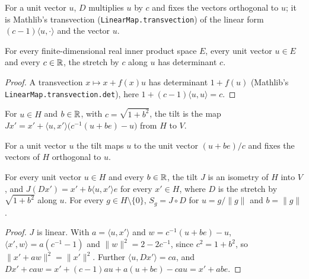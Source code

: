 For a unit vector $u$, $D$ multiplies $u$ by $c$ and fixes the vectors orthogonal to $u$; it is
Mathlib's transvection (\texttt{LinearMap.\allowbreak transvection}) of the linear form
$(c - 1)\langle u, \cdot \rangle$ and the vector $u$.

\begin{lemma}
\label{lem:det-stretch}
\leanok
{}
For every finite-dimensional real inner product space $E$, every unit vector $u \in E$ and every
$c \in \mathbb{R}$, the stretch by $c$ along $u$ has determinant $c$.
\end{lemma}

\begin{proof}
\leanok
A transvection $x \mapsto x + f(x) u$ has determinant $1 + f(u)$ (Mathlib's
\texttt{LinearMap.\allowbreak transvection.\allowbreak det}), here
$1 + (c - 1) \langle u, u \rangle = c$.
\end{proof}

\begin{definition}
\label{def:tilt}
\leanok
{}
For $u \in H$ and $b \in \mathbb{R}$, with $c = \sqrt{1 + b^2}$, the tilt is the map
$J x' = x' + \langle u, x' \rangle \bigl(c^{-1}(u + b e) - u\bigr)$ from $H$ to $V$.
\end{definition}

For a unit vector $u$ the tilt maps $u$ to the unit vector $(u + b e)/c$ and fixes the vectors of
$H$ orthogonal to $u$.

\begin{lemma}
\label{lem:tilt}
\leanok
{}
For every unit vector $u \in H$ and every $b \in \mathbb{R}$, the tilt $J$ is an isometry of $H$ into $V$,
and $J(D x') = x' + b \langle u, x' \rangle e$ for every $x' \in H$, where $D$ is the stretch by
$\sqrt{1 + b^2}$ along $u$. For every $g \in H \setminus \{0\}$, $S_g = J \circ D$ for
$u = g/\|g\|$ and $b = \|g\|$.
\end{lemma}

\begin{proof}
\leanok
$J$ is linear. With $a = \langle u, x' \rangle$ and $w = c^{-1}(u + b e) - u$,
$\langle x', w \rangle = a (c^{-1} - 1)$ and $\|w\|^2 = 2 - 2c^{-1}$, since $c^2 = 1 + b^2$, so
$\|x' + a w\|^2 = \|x'\|^2$. Further $\langle u, D x' \rangle = c a$, and
$D x' + c a w = x' + (c - 1) a u + a (u + b e) - c a u = x' + a b e$.
\end{proof}

